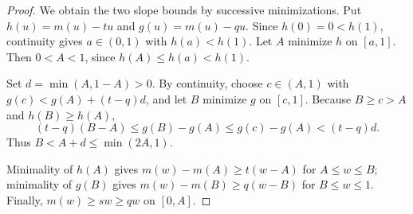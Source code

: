 \begin{proof}
We obtain the two slope bounds by successive minimizations.
Put \(h(u)=m(u)-tu\) and \(g(u)=m(u)-qu\).
Since \(h(0)=0<h(1)\), continuity gives \(a\in(0,1)\) with \(h(a)<h(1)\).
Let \(A\) minimize \(h\) on \([a,1]\).
Then \(0<A<1\), since \(h(A)\le h(a)<h(1)\).

Set \(d=\min(A,1-A)>0\).
By continuity, choose \(c\in(A,1)\) with
\(g(c)<g(A)+(t-q)d\), and let \(B\) minimize \(g\) on \([c,1]\).
Because \(B\ge c>A\) and \(h(B)\ge h(A)\),
\[
(t-q)(B-A)\le g(B)-g(A)
\le g(c)-g(A)<(t-q)d.
\]
Thus \(B<A+d\le\min(2A,1)\).

Minimality of \(h(A)\) gives
\(m(w)-m(A)\ge t(w-A)\) for \(A\le w\le B\);
minimality of \(g(B)\) gives
\(m(w)-m(B)\ge q(w-B)\) for \(B\le w\le1\).
Finally, \(m(w)\ge sw\ge qw\) on \([0,A]\).
\end{proof}

